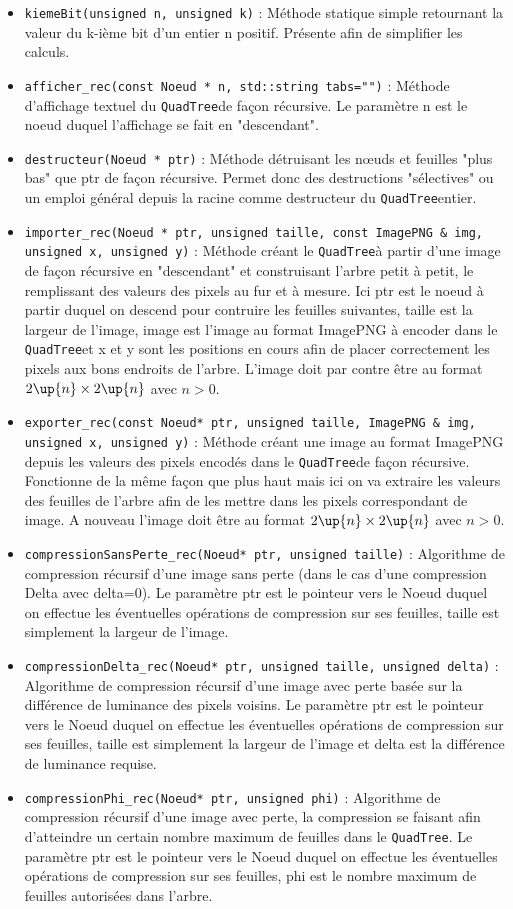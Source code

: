 \documentclass{article}
\newcommand{\info}{\texttt}
\newcommand{\qt}{\info{QuadTree}}
\begin{document}
	    \begin{itemize}
	    	\item \info{kiemeBit(unsigned n, unsigned k)} : Méthode statique simple retournant la valeur du k-ième bit d'un entier n positif. Présente afin de simplifier les calculs.
	    	\item \info{afficher_rec(const Noeud * n, std::string tabs="")} : Méthode d'affichage textuel du \qt de façon récursive. Le paramètre n est le noeud duquel l'affichage se fait en "descendant".
	    	\item \info{destructeur(Noeud * ptr)} : Méthode détruisant les nœuds et feuilles "plus bas" que ptr de façon récursive. Permet donc des destructions "sélectives" ou un emploi général depuis la racine comme destructeur du \qt entier.
	    	\item \info{importer_rec(Noeud * ptr, unsigned taille, const ImagePNG & img, unsigned x, unsigned y)} : Méthode créant le \qt à partir d'une image de façon récursive en "descendant" et construisant l'arbre petit à petit, le remplissant des valeurs des pixels au fur et à mesure. Ici ptr est le noeud à partir duquel on descend pour contruire les feuilles suivantes, taille est la largeur de l'image, image est l'image au format ImagePNG à encoder dans le \qt et x et y sont les positions en cours afin de placer correctement les pixels aux bons endroits de l'arbre. L'image doit par contre être au format $2\up{n}\times2\up{n}$ avec $n>0$.
	    	\item \info{exporter_rec(const Noeud* ptr, unsigned taille, ImagePNG & img, unsigned x, unsigned y)} : Méthode créant une image au format ImagePNG depuis les valeurs des pixels encodés dans le \qt de façon récursive. Fonctionne de la même façon que plus haut mais ici on va extraire les valeurs des feuilles de l'arbre afin de les mettre dans les pixels correspondant de image. A nouveau l'image doit être au format $2\up{n}\times2\up{n}$ avec $n>0$.
	    	\item \info{compressionSansPerte_rec(Noeud* ptr, unsigned taille)} : Algorithme de compression récursif d'une image sans perte (dans le cas d'une compression Delta avec delta=0). Le paramètre ptr est le pointeur vers le Noeud duquel on effectue les éventuelles opérations de compression sur ses feuilles, taille est simplement la largeur de l'image.
	    	\item \info{compressionDelta_rec(Noeud* ptr, unsigned taille, unsigned delta)} : Algorithme de compression récursif d'une image avec perte basée sur la différence de luminance des pixels voisins. Le paramètre ptr est le pointeur vers le Noeud duquel on effectue les éventuelles opérations de compression sur ses feuilles, taille est simplement la largeur de l'image et delta est la différence de luminance requise.
	    	\item \info{compressionPhi_rec(Noeud* ptr, unsigned phi)} : Algorithme de compression récursif d'une image avec perte, la compression se faisant afin d'atteindre un certain nombre maximum de feuilles dans le \qt. Le paramètre ptr est le pointeur vers le Noeud duquel on effectue les éventuelles opérations de compression sur ses feuilles, phi est le nombre maximum de feuilles autorisées dans l'arbre.
	    \end{itemize}
    
\end{document}
